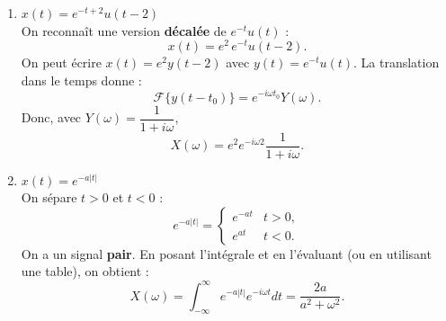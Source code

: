 \begin{solution}
\begin{enumerate}[label=(\alph*)]
        On va donc en fait résoudre cette intégrale : 
        \[
        \begin{aligned}
          X(\omega) &= \int_{-\infty}^{\infty} \dfrac{1}{\pi t}\sin(Wt) e^{-i\omega t}\,dt
        \end{aligned}
        \]
         
        \item[\textbf{(*)}] $x(t) = e^{-t+2}u(t-2)$ \\

        On reconnaît une version \textbf{décalée} de $e^{-t}u(t)$ :
        \[
          x(t) = e^{2} \, e^{-t}u(t-2).
        \]
        On peut écrire $x(t) = e^{2} y(t-2)$ avec $y(t)=e^{-t}u(t)$.  
        La translation dans le temps donne :
        \[
          \mathcal{F}\{y(t-t_0)\} = e^{-i\omega t_0}Y(\omega).
        \]
        Donc, avec $Y(\omega) = \dfrac{1}{1+i\omega}$,
        \[
          X(\omega) = e^{2} e^{-i\omega 2} \frac{1}{1 + i\omega}.
        \]
        
        \item[\textbf{(*)}] $x(t) = e^{-a|t|}$ \\

        On sépare $t>0$ et $t<0$ :
        \[
          e^{-a|t|} =
          \begin{cases}
            e^{-at} & t>0,\\
            e^{at}  & t<0.
          \end{cases}
        \]
        On a un signal \textbf{pair}.  
        En posant l’intégrale et en l’évaluant (ou en utilisant une table), on obtient :
        \[
          X(\omega) = \int_{-\infty}^{\infty} e^{-a|t|}e^{-i\omega t}dt
          = \frac{2a}{a^2 + \omega^2}.
        \]
        
    \end{enumerate}
\end{solution}

